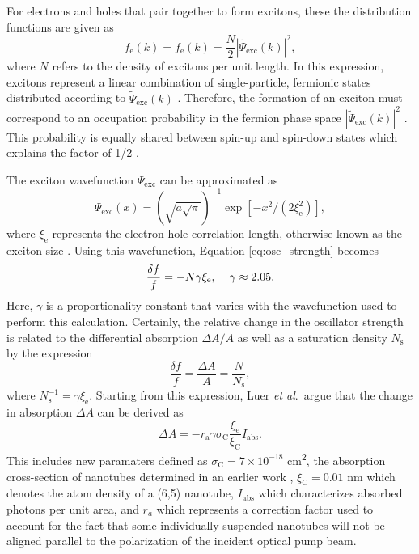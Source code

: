 For electrons and holes that pair together to form excitons, these the distribution functions are given as
%
\begin{equation}
	f_\text{e}(k) = f_\text{e}(k) = \frac{N}{2} | \tilde{\Psi}_\text{exc}(k)|^2,
\end{equation}
%
where $N$ refers to the density of excitons per unit length. In this expression, excitons represent a linear combination of single-particle, fermionic states distributed according to $\tilde{\Psi}_\text{exc}(k)$ \cite{schmitt1985theory}. Therefore, the formation of an exciton must correspond to an occupation probability in the fermion phase space $|\tilde{\Psi}_\text{exc}(k)|^2$ \cite{schmitt1985theory}. This probability is equally shared between spin-up and spin-down states which explains the factor of 1/2 \cite{schmitt1985theory}.

The exciton wavefunction $\Psi_\text{exc}$ can be approximated as
\begin{equation}
	\Psi_\text{exc}(x) = \left( \sqrt{a \sqrt{\pi}} \right)^{-1} \exp[-x^2 / (2 \xi^2_\text{e})],
\end{equation}
where $\xi_\text{e}$ represents the electron-hole correlation length, otherwise known as the exciton size \cite{capaz2006diameter}. Using this wavefunction, Equation \eqref{eq:osc_strength} becomes
%
\begin{equation}
	\frac{\delta f}{f} = - N \gamma \xi_\text{e}, \hspace{4mm} \gamma \approx 2.05.
\end{equation}
%
Here, $\gamma$ is a proportionality constant that varies with the wavefunction used to perform this calculation. Certainly, the relative change in the oscillator strength is related to the differential absorption $\Delta A / A$ as well as a saturation density $N_\text{s}$ by the expression
\begin{equation}
	\frac{\delta f}{f} = \frac{\Delta A}{A} = \frac{N}{N_\text{s}},
\end{equation}
where $N_\text{s}^{-1} = \gamma \xi_\text{e}$. Starting from this expression, Luer \textit{et al}.\ argue that the change in absorption $\Delta A$ can be derived as
\begin{equation}
	\Delta A = -r_\text{a} \gamma \sigma_\text{C} \frac{\xi_\text{e}}{\xi_\text{C}} I_\text{abs}.
	\label{eq:abs_exc_len}
\end{equation}
This includes new paramaters defined as $\sigma_\text{C} = 7 \times 10^{-18}$ \si{\cm\squared}, the absorption cross-section of nanotubes determined in an earlier work \cite{zheng2004solution}, $\xi_\text{C} = 0.01$ nm which denotes the atom density of a (6,5) nanotube, $I_\text{abs}$ which characterizes absorbed photons per unit area, and $r_{a}$ which represents a correction factor used to account for the fact that some individually suspended nanotubes will not be aligned parallel to the polarization of the incident optical pump beam.

